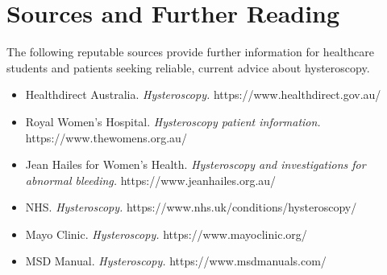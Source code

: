 \section*{Sources and Further Reading}
The following reputable sources provide further information for healthcare students and patients seeking reliable, current advice about hysteroscopy.
\begin{itemize}
    \item Healthdirect Australia. \textit{Hysteroscopy.} https://www.healthdirect.gov.au/
    \item Royal Women's Hospital. \textit{Hysteroscopy patient information.} https://www.thewomens.org.au/
    \item Jean Hailes for Women's Health. \textit{Hysteroscopy and investigations for abnormal bleeding.} https://www.jeanhailes.org.au/
    \item NHS. \textit{Hysteroscopy.} https://www.nhs.uk/conditions/hysteroscopy/
    \item Mayo Clinic. \textit{Hysteroscopy.} https://www.mayoclinic.org/
    \item MSD Manual. \textit{Hysteroscopy.} https://www.msdmanuals.com/
\end{itemize}
